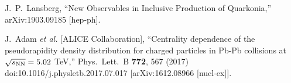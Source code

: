 \documentclass[a4paper,11pt]{article}
\begin{document}
\noindent
\begin{thebibliography}{100}
\medskip
  J.~P.~Lansberg,
  ``New Observables in Inclusive Production of Quarkonia,''
  arXiv:1903.09185 [hep-ph].
  
  J.~Adam {\it et al.} [ALICE Collaboration],
  ``Centrality dependence of the pseudorapidity density distribution for charged particles
  in Pb-Pb collisions at $\sqrt{s_{\rm NN}}=5.02$ TeV,''
  Phys.\ Lett.\ B {\bf 772}, 567 (2017)
  doi:10.1016/j.physletb.2017.07.017
  [arXiv:1612.08966 [nucl-ex]].




  
\end{thebibliography}
\end{document}
